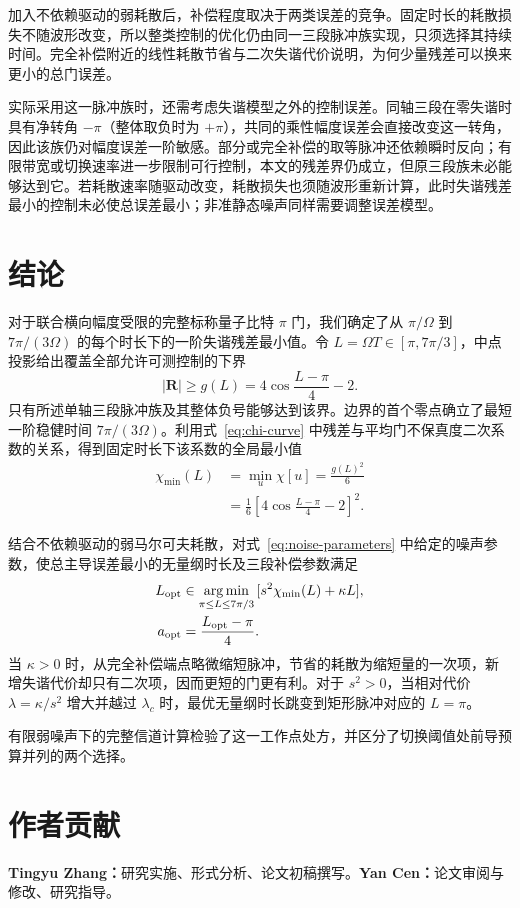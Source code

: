 \documentclass[12pt]{iopjournal}
\theoremstyle{definition}
\renewcommand{\roles}[1]{\section*{作者贡献}#1}
\newcommand{\Rvec}{\mathbf R}
\begin{document}
加入不依赖驱动的弱耗散后，补偿程度取决于两类误差的竞争。固定时长的耗散损失不随波形改变，所以整类控制的优化仍由同一三段脉冲族实现，只须选择其持续时间。完全补偿附近的线性耗散节省与二次失谐代价说明，为何少量残差可以换来更小的总门误差。

实际采用这一脉冲族时，还需考虑失谐模型之外的控制误差。同轴三段在零失谐时具有净转角 $-\pi$（整体取负时为 $+\pi$），共同的乘性幅度误差会直接改变这一转角，因此该族仍对幅度误差一阶敏感。部分或完全补偿的取等脉冲还依赖瞬时反向；有限带宽或切换速率进一步限制可行控制，本文的残差界仍成立，但原三段族未必能够达到它。若耗散速率随驱动改变，耗散损失也须随波形重新计算，此时失谐残差最小的控制未必使总误差最小；非准静态噪声同样需要调整误差模型。

\section{结论}
\label{sec:conclusion}

对于联合横向幅度受限的完整标称量子比特 $\pi$ 门，我们确定了从 $\pi/\Omega$ 到 $7\pi/(3\Omega)$ 的每个时长下的一阶失谐残差最小值。令 $L=\Omega T\in[\pi,7\pi/3]$，中点投影给出覆盖全部允许可测控制的下界
\begin{equation*}
 |\Rvec|\ge g(L)=4\cos\frac{L-\pi}{4}-2.
\end{equation*}
只有所述单轴三段脉冲族及其整体负号能够达到该界。边界的首个零点确立了最短一阶稳健时间 $7\pi/(3\Omega)$。利用式~\eqref{eq:chi-curve} 中残差与平均门不保真度二次系数的关系，得到固定时长下该系数的全局最小值
\begin{equation*}
 \begin{aligned}
 \chi_{\min}(L)&=\min_u\chi[u]=\frac{g(L)^2}{6}\\
 &=\frac16\left[4\cos\frac{L-\pi}{4}-2\right]^2.
 \end{aligned}
\end{equation*}

结合不依赖驱动的弱马尔可夫耗散，对式~\eqref{eq:noise-parameters} 中给定的噪声参数，使总主导误差最小的无量纲时长及三段补偿参数满足
\begin{equation*}
 \begin{aligned}
 L_{\rm opt}&\in\underset{\pi\le L\le7\pi/3}{\arg\min}\,[s^2\chi_{\min}(L)+\kappa L],\\
 a_{\rm opt}&=\frac{L_{\rm opt}-\pi}{4}.
 \end{aligned}
\end{equation*}
当 $\kappa>0$ 时，从完全补偿端点略微缩短脉冲，节省的耗散为缩短量的一次项，新增失谐代价却只有二次项，因而更短的门更有利。对于 $s^2>0$，当相对代价 $\lambda=\kappa/s^2$ 增大并越过 $\lambda_c$ 时，最优无量纲时长跳变到矩形脉冲对应的 $L=\pi$。

有限弱噪声下的完整信道计算检验了这一工作点处方，并区分了切换阈值处前导预算并列的两个选择。

\roles{
\textbf{Tingyu Zhang：}研究实施、形式分析、论文初稿撰写。\textbf{Yan Cen：}论文审阅与修改、研究指导。
}



\end{document}

